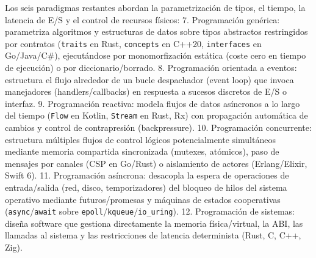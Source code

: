 \documentclass{book}
\begin{document}
Los seis paradigmas restantes abordan la parametrización de tipos, el tiempo, la latencia de E/S y el control de recursos físicos:
7. Programación genérica: parametriza algoritmos y estructuras de datos sobre tipos abstractos restringidos por contratos (\texttt{traits} en Rust, \texttt{concepts} en C++20, \texttt{interfaces} en Go/Java/C\#), ejecutándose por monomorfización estática (coste cero en tiempo de ejecución) o por diccionario/borrado.
8. Programación orientada a eventos: estructura el flujo alrededor de un bucle despachador (event loop) que invoca manejadores (handlers/callbacks) en respuesta a sucesos discretos de E/S o interfaz.
9. Programación reactiva: modela flujos de datos asíncronos a lo largo del tiempo (\texttt{Flow} en Kotlin, \texttt{Stream} en Rust, Rx) con propagación automática de cambios y control de contrapresión (backpressure).
10. Programación concurrente: estructura múltiples flujos de control lógicos potencialmente simultáneos mediante memoria compartida sincronizada (mutexes, atómicos), paso de mensajes por canales (CSP en Go/Rust) o aislamiento de actores (Erlang/Elixir, Swift 6).
11. Programación asíncrona: desacopla la espera de operaciones de entrada/salida (red, disco, temporizadores) del bloqueo de hilos del sistema operativo mediante futuros/promesas y máquinas de estados cooperativas (\texttt{async}/\texttt{await} sobre \texttt{epoll}/\texttt{kqueue}/\texttt{io\_uring}).
12. Programación de sistemas: diseña software que gestiona directamente la memoria física/virtual, la ABI, las llamadas al sistema y las restricciones de latencia determinista (Rust, C, C++, Zig).
\end{document}

